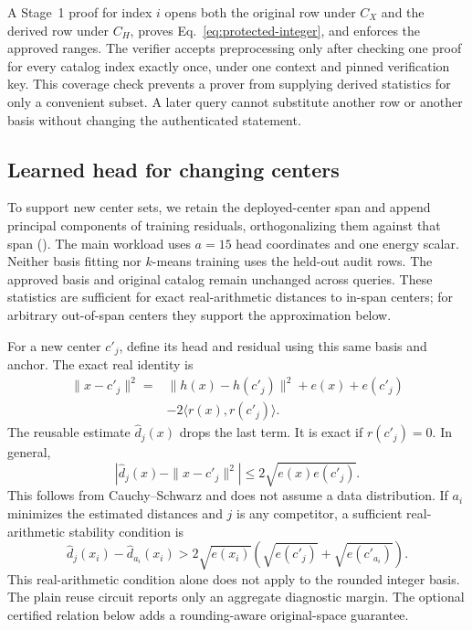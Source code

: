 A Stage~1 proof for index $i$ opens both the original row under $C_X$ and the derived row under $C_H$, proves Eq.~\eqref{eq:protected-integer}, and enforces the approved ranges. The verifier accepts preprocessing only after checking one proof for every catalog index exactly once, under one context and pinned verification key. This coverage check prevents a prover from supplying derived statistics for only a convenient subset. A later query cannot substitute another row or another basis without changing the authenticated statement.

\subsection{Learned head for changing centers}\label{sec:reuse}
To support new center sets, we retain the deployed-center span and append principal components of training residuals, orthogonalizing them against that span (). The main workload uses $a=15$ head coordinates and one energy scalar. Neither basis fitting nor $k$-means training uses the held-out audit rows. The approved basis and original catalog remain unchanged across queries. These statistics are sufficient for exact real-arithmetic distances to in-span centers; for arbitrary out-of-span centers they support the approximation below.

For a new center $c'_j$, define its head and residual using this same basis and anchor. The exact real identity is
\begin{align}
\|x-c'_j\|^2={}&\|h(x)-h(c'_j)\|^2+e(x)+e(c'_j)\nonumber\\
&-2\langle r(x),r(c'_j)\rangle.\label{eq:new-center-exact}
\end{align}
The reusable estimate $\widehat d_j(x)$ drops the last term. It is exact if $r(c'_j)=0$. In general,
\begin{equation}\label{eq:reuse-error}
|\widehat d_j(x)-\|x-c'_j\|^2|\le2\sqrt{e(x)e(c'_j)}.
\end{equation}
This follows from Cauchy--Schwarz and does not assume a data distribution. If $a_i$ minimizes the estimated distances and $j$ is any competitor, a sufficient real-arithmetic stability condition is
\begin{equation}\label{eq:reuse-certificate}
\widehat d_j(x_i)-\widehat d_{a_i}(x_i)>
2\sqrt{e(x_i)}\left(\sqrt{e(c'_j)}+\sqrt{e(c'_{a_i})}\right).
\end{equation}
This real-arithmetic condition alone does not apply to the rounded integer basis. The plain reuse circuit reports only an aggregate diagnostic margin. The optional certified relation below adds a rounding-aware original-space guarantee.

